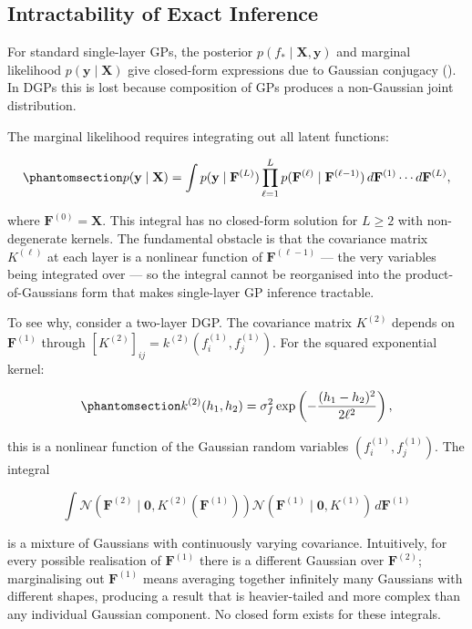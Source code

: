 \documentclass[
  letterpaper,
  DIV=11,
  numbers=noendperiod]{scrartcl}
\begin{document}
\subsection{Intractability of Exact
Inference}\label{intractability-of-exact-inference}

For standard single-layer GPs, the posterior
\(p(f_* \mid \mathbf{X}, \mathbf{y})\) and marginal likelihood
\(p(\mathbf{y} \mid \mathbf{X})\) give closed-form expressions due to
Gaussian conjugacy (). In DGPs this is lost because composition of GPs
produces a non-Gaussian joint distribution.

The marginal likelihood requires integrating out all latent functions:

\begin{equation}\phantomsection\label{eq-dgp_marginal_likelihood}{
p(\mathbf{y} \mid \mathbf{X}) = \int p(\mathbf{y} \mid \mathbf{F}^{(L)}) \prod_{\ell=1}^{L} p(\mathbf{F}^{(\ell)} \mid \mathbf{F}^{(\ell-1)}) \, d\mathbf{F}^{(1)} \cdots d\mathbf{F}^{(L)},
}\end{equation}

where \(\mathbf{F}^{(0)} = \mathbf{X}\). This integral has no
closed-form solution for \(L \geq 2\) with non-degenerate kernels. The
fundamental obstacle is that the covariance matrix \(K^{(\ell)}\) at
each layer is a nonlinear function of \(\mathbf{F}^{(\ell-1)}\) --- the
very variables being integrated over --- so the integral cannot be
reorganised into the product-of-Gaussians form that makes single-layer
GP inference tractable.

To see why, consider a two-layer DGP. The covariance matrix \(K^{(2)}\)
depends on \(\mathbf{F}^{(1)}\) through
\([K^{(2)}]_{ij} = k^{(2)}(f_i^{(1)}, f_j^{(1)})\). For the squared
exponential kernel:

\begin{equation}\phantomsection\label{eq-se_random_inputs}{
k^{(2)}(h_1, h_2) = \sigma_f^2 \exp\left(-\frac{(h_1 - h_2)^2}{2\ell^2}\right),
}\end{equation}

this is a nonlinear function of the Gaussian random variables
\((f_i^{(1)}, f_j^{(1)})\). The integral

\[
\int \mathcal{N}(\mathbf{F}^{(2)} \mid \mathbf{0}, K^{(2)}(\mathbf{F}^{(1)})) \mathcal{N}(\mathbf{F}^{(1)} \mid \mathbf{0}, K^{(1)}) \, d\mathbf{F}^{(1)}
\]

is a mixture of Gaussians with continuously varying covariance.
Intuitively, for every possible realisation of \(\mathbf{F}^{(1)}\)
there is a different Gaussian over \(\mathbf{F}^{(2)}\); marginalising
out \(\mathbf{F}^{(1)}\) means averaging together infinitely many
Gaussians with different shapes, producing a result that is
heavier-tailed and more complex than any individual Gaussian component.
No closed form exists for these integrals.
\end{document}
